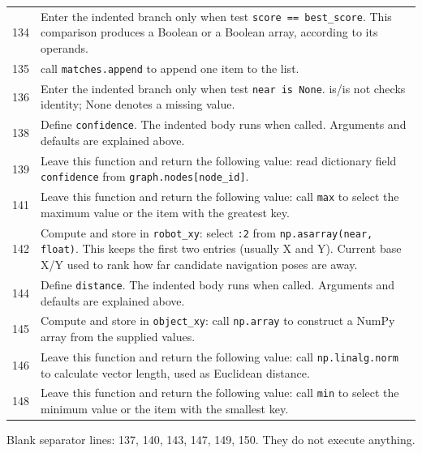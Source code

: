 \documentclass[11pt,a4paper]{book}
\begin{document}
\begin{longtable}{r p{}}
134 & Enter the indented branch only when test \texttt{score == best\_score}. This comparison produces a Boolean or a Boolean array, according to its operands. \\

135 & call \texttt{matches.append} to append one item to the list. \\

136 & Enter the indented branch only when test \texttt{near is None}. is/is not checks identity; None denotes a missing value. \\

138 & Define \texttt{confidence}. The indented body runs when called. Arguments and defaults are explained above. \\

139 & Leave this function and return the following value: read dictionary field \texttt{confidence} from \texttt{graph.nodes[node\_id]}. \\

141 & Leave this function and return the following value: call \texttt{max} to select the maximum value or the item with the greatest key. \\

142 & Compute and store in \texttt{robot\_xy}: select \texttt{:2} from \texttt{np.asarray(near, float)}. This keeps the first two entries (usually X and Y). Current base X/Y used to rank how far candidate navigation poses are away. \\

144 & Define \texttt{distance}. The indented body runs when called. Arguments and defaults are explained above. \\

145 & Compute and store in \texttt{object\_xy}: call \texttt{np.array} to construct a NumPy array from the supplied values.  \\

146 & Leave this function and return the following value: call \texttt{np.linalg.norm} to calculate vector length, used as Euclidean distance. \\

148 & Leave this function and return the following value: call \texttt{min} to select the minimum value or the item with the smallest key. \\

\end{longtable}

Blank separator lines: 137, 140, 143, 147, 149, 150. They do not execute anything.
\end{document}
